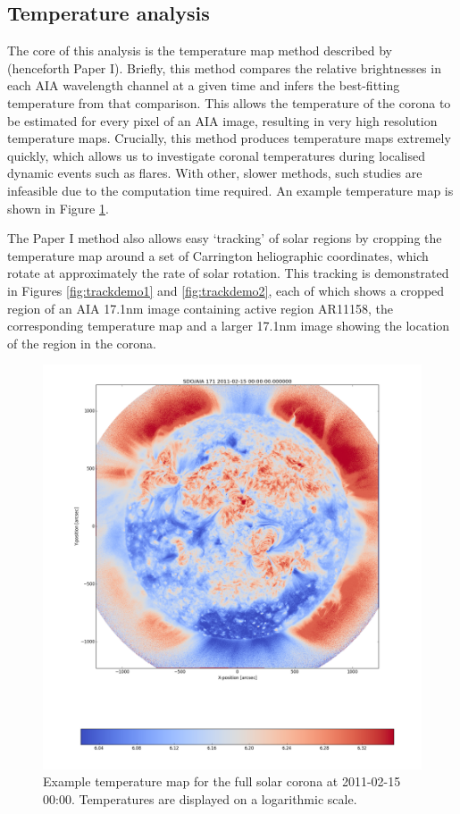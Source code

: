 \documentclass[referee,a4paper,12pt]{swsc}
\begin{document}
\begin{linenumbers}
\subsection{Temperature analysis}
The core of this analysis is the temperature map method described by \cite{Leonard} (henceforth Paper I).
Briefly, this method compares the relative brightnesses in each AIA wavelength channel at a given time and infers the best-fitting temperature from that comparison.
This allows the temperature of the corona to be estimated for every pixel of an AIA image, resulting in very high resolution temperature maps.
Crucially, this method produces temperature maps extremely quickly, which allows us to investigate coronal temperatures during localised dynamic events such as flares.
With other, slower methods, such studies are infeasible due to the computation time required.
An example temperature map is shown in Figure \ref{fig:example_tmap}.

The Paper I method also allows easy `tracking' of solar regions by cropping the temperature map around a set of Carrington heliographic coordinates, which rotate at approximately the rate of solar rotation.
This tracking is demonstrated in Figures \ref{fig:trackdemo1} and \ref{fig:trackdemo2}, each of which shows a cropped region of an AIA 17.1nm image containing active region AR11158, the corresponding temperature map and a larger 17.1nm image showing the location of the region in the corona.

\begin{figure}
	\centering
		\includegraphics[width=\columnwidth]{2011-02-15T00_00_00.png}
	\caption{Example temperature map for the full solar corona at 2011-02-15 00:00. Temperatures are displayed on a logarithmic scale.}
	\label{fig:example_tmap}
\end{figure}


\end{linenumbers}
\end{document}
